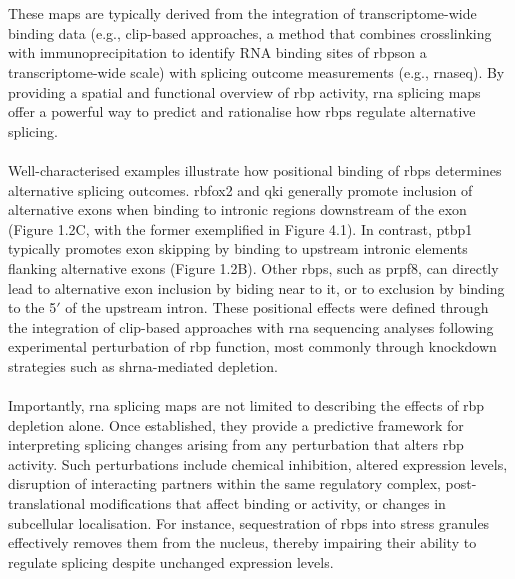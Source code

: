 \\
\\
These maps are typically derived from the integration of transcriptome-wide binding data (e.g., \gls{clip}-based approaches, a method that combines crosslinking with immunoprecipitation to identify RNA binding sites of \glspl{rbp}on a transcriptome-wide scale) with splicing outcome measurements (e.g., \gls{rnaseq})\cite{van_nostrand_large-scale_2020}. By providing a spatial and functional overview of \gls{rbp} activity, \gls{rna} splicing maps offer a powerful way to predict and rationalise how \glspl{rbp} regulate alternative splicing\cite{van_nostrand_large-scale_2020}.
\\
\\
Well-characterised examples illustrate how positional binding of \glspl{rbp} determines alternative splicing outcomes. \gls{rbfox2} and \gls{qki} generally promote inclusion of alternative exons when binding to intronic regions downstream of the exon (Figure 1.2C, with the former exemplified in Figure 4.1)\cite{van_nostrand_large-scale_2020}. In contrast, \gls{ptbp1} typically promotes exon skipping by binding to upstream intronic elements flanking alternative exons (Figure 1.2B)\cite{van_nostrand_large-scale_2020, georgilis_ptbp1-mediated_2018}. Other \glspl{rbp}, such as \gls{prpf8}, can directly lead to alternative exon inclusion by biding near to it, or to exclusion by binding to the 5$'$ of the upstream intron\cite{van_nostrand_large-scale_2020}. These positional effects were defined through the integration of \gls{clip}-based approaches with \gls{rna} sequencing analyses following experimental perturbation of \gls{rbp} function, most commonly through knockdown strategies such as \gls{shrna}-mediated depletion\cite{van_nostrand_large-scale_2020, georgilis_ptbp1-mediated_2018}.
\\
\\
Importantly, \gls{rna} splicing maps are not limited to describing the effects of \gls{rbp} depletion alone. Once established, they provide a predictive framework for interpreting splicing changes arising from any perturbation that alters \gls{rbp} activity\cite{georgilis_ptbp1-mediated_2018}. Such perturbations include chemical inhibition, altered expression levels, disruption of interacting partners within the same regulatory complex, post-translational modifications that affect binding or activity, or changes in subcellular localisation\cite{georgilis_ptbp1-mediated_2018}. For instance, sequestration of \glspl{rbp} into stress granules effectively removes them from the nucleus\cite{guo_nuclear-import_2018}, thereby impairing their ability to regulate splicing despite unchanged expression levels.
